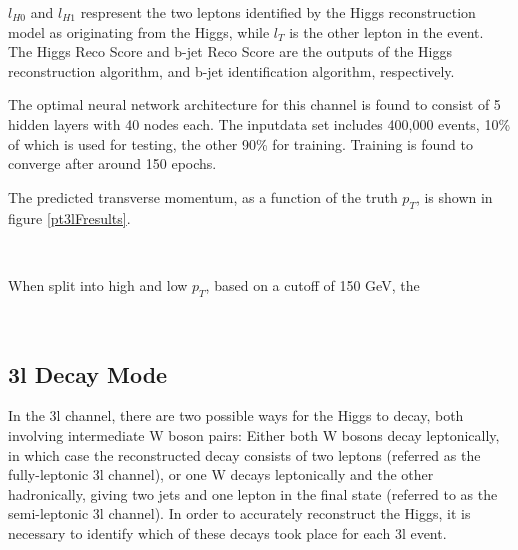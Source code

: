 

$l_{H0}$ and $l_{H1}$ respresent the two leptons identified by the Higgs reconstruction model as originating from the Higgs, while $l_T$ is the other lepton in the event. The Higgs Reco Score and b-jet Reco Score are the outputs of the Higgs reconstruction algorithm, and b-jet identification algorithm, respectively.

The optimal neural network architecture for this channel is found to consist of 5 hidden layers with 40 nodes each. The inputdata set includes 400,000 events, 10\% of which is used for testing, the other 90\% for training. Training is found to converge after around 150 epochs.

The predicted transverse momentum, as a function of the truth $p_T$, is shown in figure \ref{pt3lFresults}.
                                                                                                                             
\begin{figure}[h!]
    \\                     
    \caption{}
    \label{fig:pt3lFresults}
\end{figure}

When split into high and low $p_T$, based on a cutoff of 150 GeV, the 

\begin{figure}[h!]                                                                                                           
    \\
    \caption{}
    \label{fig:pt3lFroc}
\end{figure}

\subsection{3l Decay Mode}
\label{sec:decay3l}

In the 3l channel, there are two possible ways for the Higgs to decay, both involving intermediate W boson pairs: Either both W bosons decay leptonically, in which case the reconstructed decay consists of two leptons (referred as the fully-leptonic 3l channel), or one W decays leptonically and the other hadronically, giving two jets and one lepton in the final state (referred to as the semi-leptonic 3l channel). In order to accurately reconstruct the Higgs, it is necessary to identify which of these decays took place for each 3l event.

